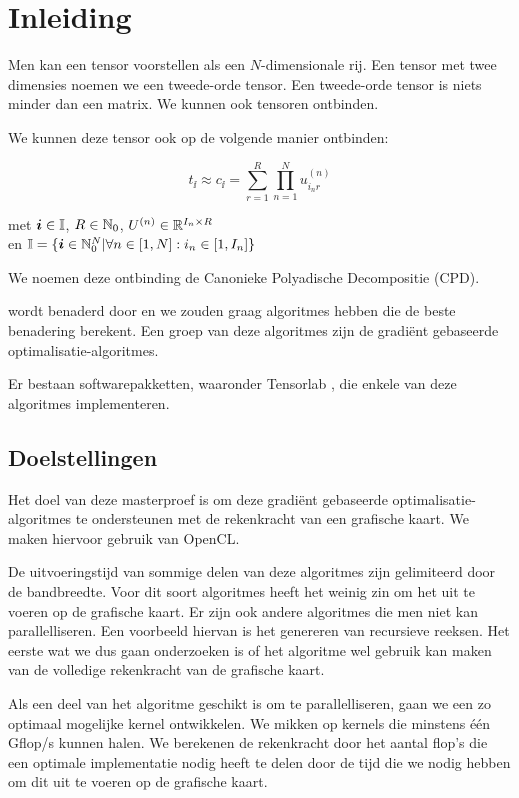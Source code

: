 \chapter{Inleiding}
\label{inleiding}
Men kan een tensor voorstellen als een $N$-dimensionale rij. Een tensor met twee dimensies noemen we een tweede-orde tensor. Een tweede-orde tensor is niets minder dan een matrix. We kunnen ook tensoren ontbinden.

We kunnen deze tensor ook op de volgende manier ontbinden:

\[
    t_{\ii{}} \approx c_{\ii{}} = \sum_{r=1}^{R} \prod_{n=1}^{N} u^{(n)}_{i_{n}r}
\]
\begin{center}
met $\boldsymbol{i}{} \in \mathbb{I}$, $R \in \mathbb{N}_0$, $U^{(n)} \in \mathbb{R}^{I_n \times R}$ \\ en $ \mathbb{I} = \{\boldsymbol{i}{} \in \mathbb{N}_0^N | \forall n \in [1, N]: i_n \in [1, I_n]\}$
\end{center}

We noemen deze ontbinding de Canonieke Polyadische Decompositie (CPD).

\TT{} wordt benaderd door \CC{} en we zouden graag algoritmes hebben die de beste benadering berekent. Een groep van deze algoritmes zijn de gradi\"ent gebaseerde optimalisatie-algoritmes. 

Er bestaan softwarepakketten, waaronder Tensorlab \cite{tensorlab}, die enkele  van deze algoritmes implementeren.

\section{Doelstellingen}

Het doel van deze masterproef is om deze gradi\"ent gebaseerde optimalisatie-algoritmes te ondersteunen met de rekenkracht van een grafische kaart. We maken hiervoor gebruik van OpenCL. 

De uitvoeringstijd van sommige delen van deze algoritmes zijn gelimiteerd door de bandbreedte. Voor dit soort algoritmes heeft het weinig zin om het uit te voeren op de grafische kaart. Er zijn ook andere algoritmes die men niet kan parallelliseren. Een voorbeeld hiervan is het genereren van recursieve reeksen. Het eerste wat we dus gaan onderzoeken is of het algoritme wel gebruik kan maken van de volledige rekenkracht van de grafische kaart.

Als een deel van het algoritme geschikt is om te parallelliseren, gaan we een zo optimaal mogelijke kernel ontwikkelen. We mikken op kernels die minstens \'e\'en Gflop/s kunnen halen. We berekenen de rekenkracht door het aantal flop's die een optimale implementatie nodig heeft te delen door de tijd die we nodig hebben om dit uit te voeren op de grafische kaart.

